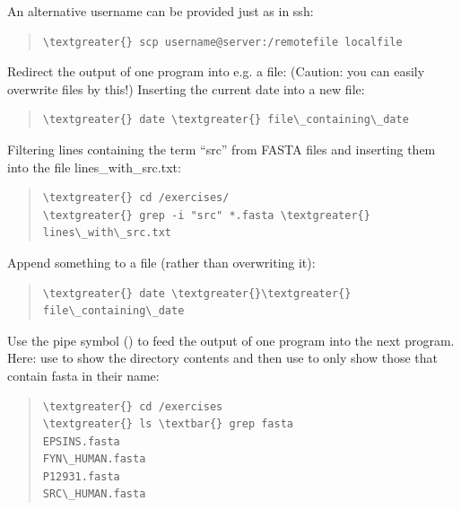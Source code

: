 \documentclass[letterpaper,10pt,english]{sphinxmanual}
\begin{document}
An alternative username can be provided just as in ssh:
\begin{quote}

\begin{Verbatim}[commandchars=\\\{\}]
\textgreater{} scp username@server:/remotefile localfile
\end{Verbatim}
\end{quote}

Redirect the output of one program into e.g. a file: (Caution: you can easily overwrite files by this!)
Inserting the current date into a new file:
\begin{quote}

\begin{Verbatim}[commandchars=\\\{\}]
\textgreater{} date \textgreater{} file\_containing\_date
\end{Verbatim}
\end{quote}

Filtering lines containing the term “src” from FASTA files and inserting them into the file lines\_with\_src.txt:
\begin{quote}

\begin{Verbatim}[commandchars=\\\{\}]
\textgreater{} cd /exercises/
\textgreater{} grep -i "src" *.fasta \textgreater{} lines\_with\_src.txt
\end{Verbatim}
\end{quote}

Append something to a file (rather than overwriting it):
\begin{quote}

\begin{Verbatim}[commandchars=\\\{\}]
\textgreater{} date \textgreater{}\textgreater{} file\_containing\_date
\end{Verbatim}
\end{quote}

Use the \index{\textbar{}}\textbar{} pipe symbol (\code{\textbar{}}) to feed the output of one program into the next program.
Here: use  to show the directory contents and then use  to only show those that contain fasta in their name:
\begin{quote}

\begin{Verbatim}[commandchars=\\\{\}]
\textgreater{} cd /exercises
\textgreater{} ls \textbar{} grep fasta
EPSINS.fasta
FYN\_HUMAN.fasta
P12931.fasta
SRC\_HUMAN.fasta
\end{Verbatim}
\end{quote}
\end{document}

